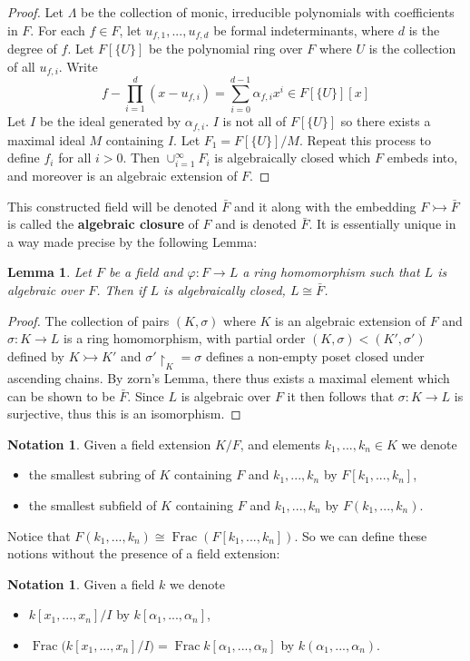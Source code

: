 \documentclass[12pt]{article}
\theoremstyle{plain}
\newtheorem{lemma}[thm]{Lemma}
\theoremstyle{definition}
\newtheorem{notation}[thm]{Notation}
\begin{document}
\begin{proof}
Let $\Lambda$ be the collection of monic, irreducible polynomials with coefficients in $F$. For each $f \in F$, let $u_{f,1},...,u_{f,d}$ be formal indeterminants, where $d$ is the degree of $f$. Let $F[\lbrace U\rbrace]$ be the polynomial ring over $F$ where $U$ is the collection of all $u_{f,i}$. Write
\[f - \prod_{i = 1}^d(x - u_{f,i}) = \sum_{i = 0}^{d-1}\alpha_{f,i}x^i \in F[\lbrace U \rbrace][x]\]
Let $I$ be the ideal generated by $\alpha_{f,i}$. $I$ is not all of $F[\lbrace U \rbrace]$ so there exists a maximal ideal $M$ containing $I$. Let $F_1 = F[\lbrace U \rbrace]/M$. Repeat this process to define $f_i$ for all $i > 0$. Then $\cup_{i = 1}^\infty F_i$ is algebraically closed which $F$ embeds into, and moreover is an algebraic extension of $F$.
\end{proof}
This constructed field will be denoted $\bar{F}$ and it along with the embedding $F \rightarrowtail \bar{F}$ is called the \textbf{algebraic closure} of $F$ and is denoted $\bar{F}$. It is essentially unique in a way made precise by the following Lemma:
\begin{lemma}
Let $F$ be a field and $\varphi: F \to L$ a ring homomorphism such that $L$ is algebraic over  $F$. Then if $L$ is algebraically closed, $L \cong \bar{F}$.
\end{lemma}
\begin{proof}
The collection of pairs $(K,\sigma)$ where $K$ is an algebraic extension of $F$ and $\sigma: K \to L$ is a ring homomorphism, with partial order $(K,\sigma) < (K',\sigma')$ defined by $K \rightarrowtail K'$ and $\sigma'\restriction_{K} = \sigma$ defines a non-empty poset closed under ascending chains. By zorn's Lemma, there thus exists a maximal element which can be shown to be $\bar{F}$. Since $L$ is algebraic over $F$ it then follows that $\sigma: K \to L$ is surjective, thus this is an isomorphism.
\end{proof}
\begin{notation}
Given a field extension $K/F$, and elements $k_1,...,k_n \in K$ we denote
\begin{itemize}
    \item the smallest subring of $K$ containing $F$ and $k_1,...,k_n$ by $F[k_1,...,k_n]$,
    \item the smallest subfield of $K$ containing $F$ and $k_1,...,k_n$ by $F(k_1,...,k_n)$.
\end{itemize}
\end{notation}
Notice that $F(k_1,...,k_n) \cong \operatorname{Frac}(F[k_1,...,k_n])$. So we can define these notions without the presence of a field extension:
\begin{notation}
\label{not:smstring_smstfield_noext}
Given a field $k$ we denote
\begin{itemize}
    \item $k[x_1,...,x_n]/I$ by $k[\alpha_1,...,\alpha_n]$,
    \item $\operatorname{Frac}\big(k[x_1,...,x_n]/I\big) = \operatorname{Frac}k[\alpha_1,...,\alpha_n]$ by $k(\alpha_1,...,\alpha_n)$.
\end{itemize}
\end{notation}
\end{document}
